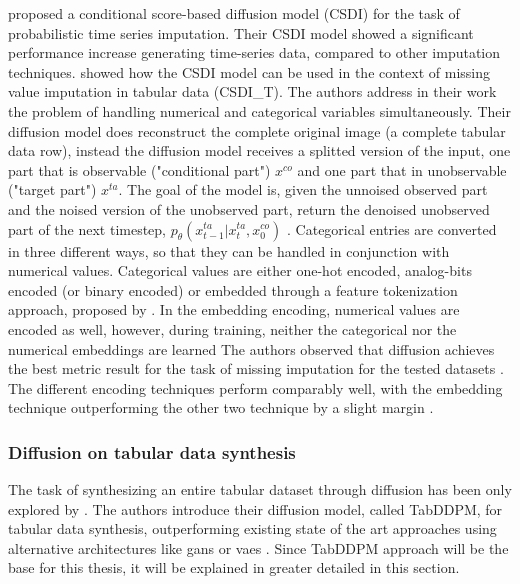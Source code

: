\cite{tashiro2021CSDIConditionalScorebased} proposed a conditional score-based diffusion model (CSDI) for the task of probabilistic time series imputation.
Their CSDI model showed a significant performance increase generating time-series data, compared to other imputation techniques.
\cite{zheng2022DiffusionModelsMissing} showed how the CSDI model can be used in the context of missing value imputation in tabular data (CSDI_T).
The authors address in their work the problem of handling numerical and categorical variables simultaneously.
Their diffusion model does reconstruct the complete original image (\eg a complete tabular data row), instead the diffusion model
receives a splitted version of the input, one part that is observable ("conditional part") $x^{co}$ and one part that in unobservable ("target part") $x^{ta}$.
The goal of the model is, given the unnoised observed part and the noised version of the unobserved part, return the denoised unobserved part of the next timestep, 
\ie $p_\theta(x^{ta}_{t-1}|x^{ta}_{t},x^{co}_{0})$ \cite{zheng2022DiffusionModelsMissing}.
Categorical entries are converted in three different ways, so that they can be handled in conjunction with numerical values.
Categorical values are either one-hot encoded, analog-bits encoded (or binary encoded) or embedded through a feature tokenization approach, proposed by \cite{gorishniy2021RevisitingDeepLearning}.
In the embedding encoding, numerical values are encoded as well, however, during training, neither the categorical nor the numerical embeddings are learned \cite{2023DiffusionModelsMissing}
The authors observed that diffusion achieves the best metric result for the task of missing imputation for the tested datasets \cite{zheng2022DiffusionModelsMissing}.
The different encoding techniques perform comparably well, with the embedding technique outperforming the other two technique by a slight margin \cite{zheng2022DiffusionModelsMissing}.


\subsubsection{Diffusion on tabular data synthesis}
\label{ch:relatedWork-diffusionModels-tabDDPM}

The task of synthesizing an entire tabular dataset through diffusion has been only explored by \cite{kotelnikov2022TabDDPMModellingTabular}.
The authors introduce their diffusion model, called TabDDPM, for tabular data synthesis, outperforming existing state of the art approaches using alternative architectures like \glspl{gan} or \glspl{vae} \cite{kotelnikov2022TabDDPMModellingTabular}. 
Since TabDDPM approach will be the base for this thesis, it will be explained in greater detailed in this section.

